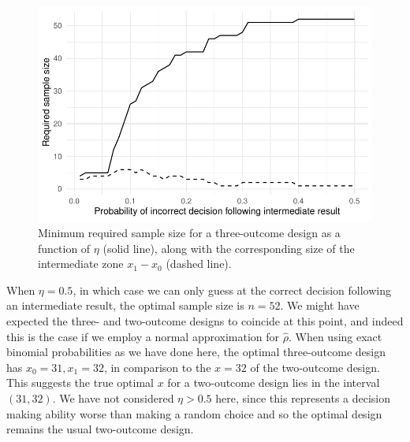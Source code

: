 \documentclass[sagev]{sagej} %
\begin{document}
\begin{figure}
\centering
\includegraphics[scale=0.8]{./figures/eta_ns}
\caption{Minimum required sample size for a three-outcome design as a function of $\eta$ (solid line), along with the corresponding size of the intermediate zone $x_1 - x_0$ (dashed line).}
\label{fig:eta_ns}
\end{figure}

When $\eta = 0.5$, in which case we can only guess at the correct decision following an intermediate result, the optimal sample size is $n = 52$. We might have expected the three- and two-outcome designs to coincide at this point, and indeed this is the case if we employ a normal approximation for $\hat{\rho}$. When using exact binomial probabilities as we have done here, the optimal three-outcome design has $x_0 = 31, x_1 = 32$, in comparison to the $x = 32$ of the two-outcome design. This suggests the true optimal $x$ for a two-outcome design lies in the interval $(31, 32)$. We have not considered $\eta > 0.5$ here, since this represents a decision making ability worse than making a random choice and so the optimal design remains the usual two-outcome design.
\end{document}
